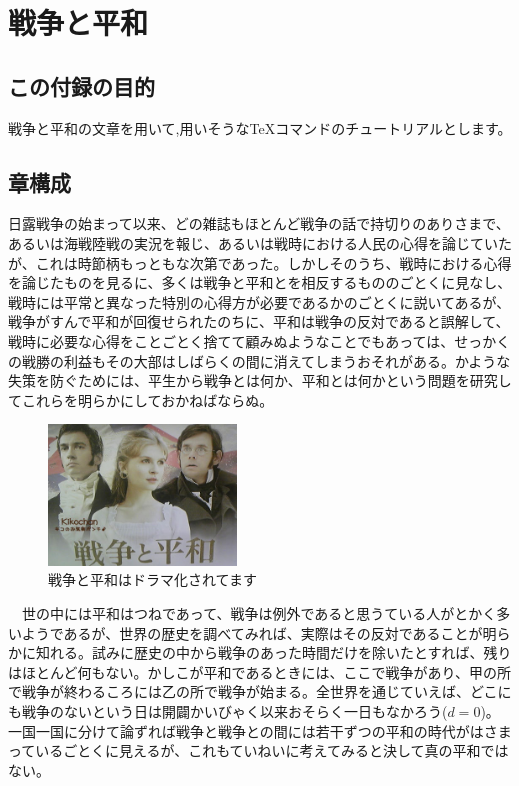 \chapter{戦争と平和}

\section{この付録の目的}
戦争と平和の文章を用いて,用いそうな\TeX コマンドのチュートリアルとします。

\section{章構成}

日露戦争の始まって以来、どの雑誌もほとんど戦争の話で持切りのありさまで、あるいは海戦陸戦の実況を報じ、あるいは戦時における人民の心得を論じていたが、これは時節柄もっともな次第であった。しかしそのうち、戦時における心得を論じたものを見るに、多くは戦争と平和とを相反するもののごとくに見なし、戦時には平常と異なった特別の心得方が必要であるかのごとくに説いてあるが、戦争がすんで平和が回復せられたのちに、平和は戦争の反対であると誤解して、戦時に必要な心得をことごとく捨てて顧みぬようなことでもあっては、せっかくの戦勝の利益もその大部はしばらくの間に消えてしまうおそれがある。かような失策を防ぐためには、平生から戦争とは何か、平和とは何かという問題を研究してこれらを明らかにしておかねばならぬ。

\begin{figure}[htbp]
	\centering
		\includegraphics[width=5cm]{img/war_and_peace.jpg}
	\caption{戦争と平和はドラマ化されてます}
	\label{warAndPeace}
\end{figure}

　世の中には平和はつねであって、戦争は例外であると思うている人がとかく多いようであるが、世界の歴史を調べてみれば、実際はその反対であることが明らかに知れる。試みに歴史の中から戦争のあった時間だけを除いたとすれば、残りはほとんど何もない。かしこが平和であるときには、ここで戦争があり、甲の所で戦争が終わるころには乙の所で戦争が始まる。全世界を通じていえば、どこにも戦争のないという日は開闢かいびゃく以来おそらく一日もなかろう($d=0$)。一国一国に分けて論ずれば戦争と戦争との間には若干ずつの平和の時代がはさまっているごとくに見えるが、これもていねいに考えてみると決して真の平和ではない。

